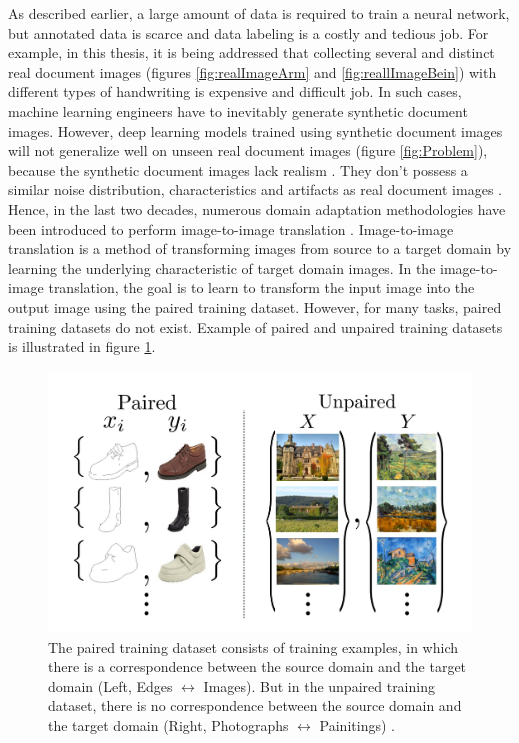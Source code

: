 As described earlier, a large amount of data is required to train a neural network, but annotated data is scarce and data labeling is a costly and tedious job. For example, in this thesis, it is being addressed that collecting several and distinct real document images (figures \ref{fig:realImageArm} and \ref{fig:reallImageBein}) with different types of handwriting is expensive and difficult job. In such cases, machine learning engineers have to inevitably generate synthetic document images. However, deep learning models trained using synthetic document images will not generalize well on unseen real document images (figure \ref{fig:Problem}), because the synthetic document images lack realism  \cite{8978087}. They don't possess a similar noise distribution, characteristics and artifacts as real document images \cite{8978087}. Hence, in the last two decades, numerous domain adaptation methodologies have been introduced to perform image-to-image translation \cite{8978011}. Image-to-image translation is a method of transforming images from source to a target domain by learning the underlying characteristic of target domain images. In the image-to-image translation, the goal is to learn to transform the input image into the output image using the paired training dataset. However, for many tasks, paired training datasets do not exist. Example of paired and unpaired training datasets is illustrated in figure \ref{fig:pairedUnpaired}. 





\begin{figure}[H]
        \begin{center}
	    \includegraphics[scale=0.50]{images/Introduction/pairedUnpaired.JPG}
	    \caption[Examples of the paired training dataset and the unpaired training dataset.]{The paired training dataset consists of training examples, in which there is a correspondence between the source domain and the target domain (Left, Edges $\leftrightarrow$ Images). But in the unpaired training dataset, there is no correspondence between the source domain and the target domain (Right, Photographs $\leftrightarrow$ Painitings) \cite{zhu2020unpaired}.}
	    \label{fig:pairedUnpaired}
	    \end{center}
\end{figure}


